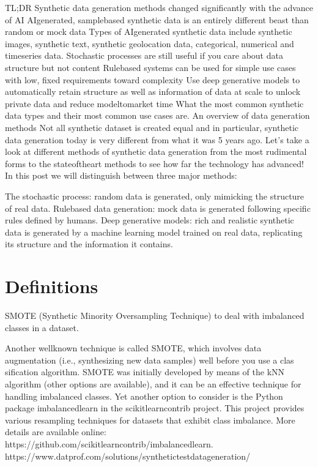 \documentclass[letterpaper,10pt,english]{jupyterBook}
\begin{document}
\sphinxAtStartPar
TL;DR
Synthetic data generation methods changed significantly with the advance of AI
AI\sphinxhyphen{}generated, sample\sphinxhyphen{}based synthetic data is an entirely different beast than random or mock data
Types of AI\sphinxhyphen{}generated synthetic data include synthetic images, synthetic text, synthetic geolocation data, categorical, numerical and time\sphinxhyphen{}series data.
Stochastic processes are still useful if you care about data structure but not content
Rule\sphinxhyphen{}based systems can be used for simple use cases with low, fixed requirements toward complexity
Use deep generative models to automatically retain structure as well as information of data at scale to unlock private data and reduce model\sphinxhyphen{}to\sphinxhyphen{}market time
What the most common synthetic data types and their most common use cases are.
An overview of data generation methods
Not all synthetic dataset is created equal and in particular, synthetic data generation today is very different from what it was 5 years ago. Let’s take a look at different methods of synthetic data generation from the most rudimental forms to the state\sphinxhyphen{}of\sphinxhyphen{}the\sphinxhyphen{}art methods to see how far the technology has advanced! In this post we will distinguish between three major methods:

\sphinxAtStartPar
The stochastic process: random data is generated, only mimicking the structure of real data.
Rule\sphinxhyphen{}based data generation: mock data is generated following specific rules defined by humans.
Deep generative models: rich and realistic synthetic data is generated by a machine learning model trained on real data, replicating its structure and the information it contains.


\chapter{Definitions}
\label{\detokenize{src/dsforum/fake_synth/DSF_intro:definitions}}
\sphinxAtStartPar
SMOTE (Synthetic Minority Oversampling Technique) to deal with imbalanced classes in a dataset.

\sphinxAtStartPar
Another well\sphinxhyphen{}known technique is called SMOTE, which involves data augmentation (i.e., synthesizing new data samples) well before you use a clas\sphinxhyphen{} sification algorithm. SMOTE was initially developed by means of the kNN algorithm (other options are available), and it can be an effective technique for handling imbalanced classes.
Yet another option to consider is the Python package imbalanced\sphinxhyphen{}learn in the scikit\sphinxhyphen{}learn\sphinxhyphen{}contrib project. This project provides various re\sphinxhyphen{}sampling techniques for datasets that exhibit class imbalance. More details are available online:
https://github.com/scikit\sphinxhyphen{}learn\sphinxhyphen{}contrib/imbalanced\sphinxhyphen{}learn.
https://www.datprof.com/solutions/synthetic\sphinxhyphen{}test\sphinxhyphen{}data\sphinxhyphen{}generation/
\end{document}
